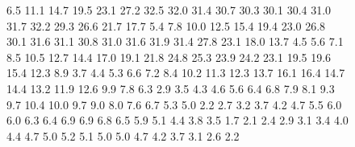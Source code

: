\begin{figure}[hbt]
{6.5     11.1     14.7     19.5     23.1     27.2     32.5     32.0     31.4     30.7     30.3     30.1     30.4     31.0     31.7     32.2     29.3     26.6     21.7     17.7
5.4     7.8     10.0     12.5     15.4     19.4     23.0     26.8     30.1     31.6     31.1     30.8     31.0     31.6     31.9     31.4     27.8     23.1     18.0     13.7
4.5     5.6     7.1     8.5     10.5     12.7     14.4     17.0     19.1     21.8     24.8     25.3     23.9     24.2     23.1     19.5     19.6     15.4     12.3     8.9
3.7     4.4     5.3     6.6     7.2     8.4     10.2     11.3     12.3     13.7     16.1     16.4     14.7     14.4     13.2     11.9     12.6     9.9     7.8     6.3
2.9     3.5     4.3     4.6     5.6     6.4     6.8     7.9     8.1     9.3     9.7     10.4     10.0     9.7     9.0     8.0     7.6     6.7     5.3     5.0
2.2     2.7     3.2     3.7     4.2     4.7     5.5     6.0     6.0     6.3     6.4     6.9     6.9     6.8     6.5     5.9     5.1     4.4     3.8     3.5
1.7     2.1     2.4     2.9     3.1     3.4     4.0     4.4     4.7     5.0     5.2     5.1     5.0     5.0     4.7     4.2     3.7     3.1     2.6     2.2
                }
\end{figure}
%